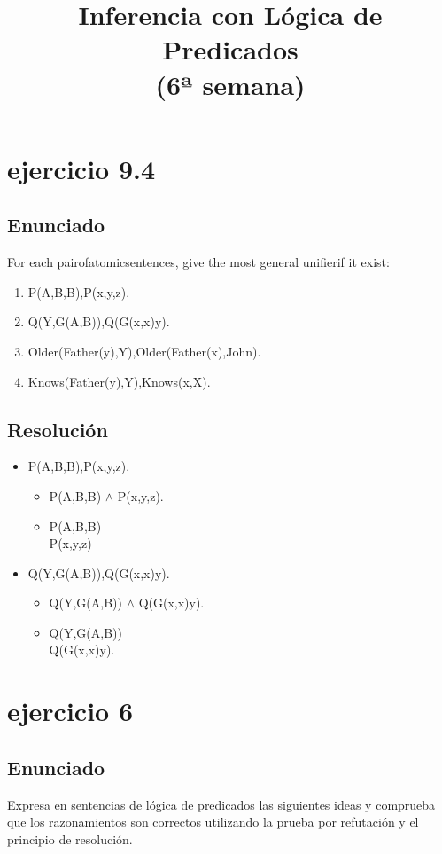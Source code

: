 \documentclass[a4paper,10pt]{article}
\title{Inferencia con Lógica de Predicados\\(6ª semana)}
\begin{document}
\maketitle
\pagebreak
\tableofcontents
\pagebreak


\section{ejercicio 9.4}
\subsection{Enunciado}
For each pairofatomicsentences, give the most general unifierif  it exist:
\begin{enumerate}
	\item P(A,B,B),P(x,y,z).
	\item Q(Y,G(A,B)),Q(G(x,x)y).
	\item Older(Father(y),Y),Older(Father(x),John).
	\item Knows(Father(y),Y),Knows(x,X).
\end{enumerate}
\subsection{Resolución}
\begin{itemize}
	\item	P(A,B,B),P(x,y,z).
	\begin{itemize}
		\item P(A,B,B) $\land$ P(x,y,z).
		\item P(A,B,B)\\P(x,y,z)
	\end{itemize}
	\item Q(Y,G(A,B)),Q(G(x,x)y).
	\begin{itemize}
		\item Q(Y,G(A,B)) $\land$ Q(G(x,x)y).
		\item Q(Y,G(A,B))\\Q(G(x,x)y).
	\end{itemize}
\end{itemize}


\vspace{1cm}
\section{ejercicio 6}
\subsection{Enunciado}
Expresa   en   sentencias   de   lógica   de   predicados   las   siguientes   ideas   y   comprueba   que los razonamientos son correctos utilizando la prueba por refutación y el principio de resolución.
\end{document}
